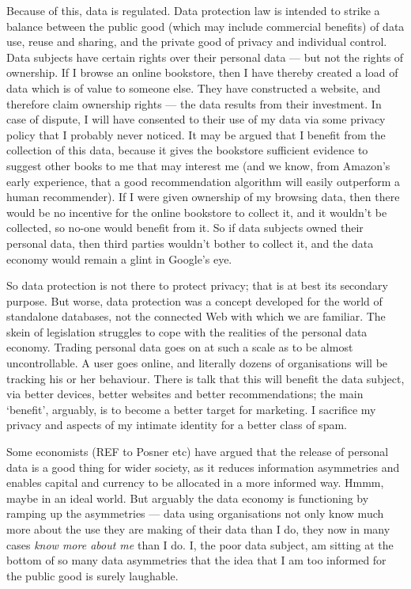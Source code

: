 \documentclass[runningheads,a4paper]{llncs}
\begin{document}
Because of this, data is regulated. Data protection law is intended to strike a balance between the public good (which may include commercial benefits) of data use, reuse and sharing, and the private good of privacy and individual control. Data subjects have certain rights over their personal data --- but not the rights of ownership. If I browse an online bookstore, then I have thereby created a load of data which is of value to someone else. They have constructed a website, and therefore claim ownership rights --- the data results from their investment. In case of dispute, I will have consented to their use of my data via some privacy policy that I probably never noticed. It may be argued that I benefit from the collection of this data, because it gives the bookstore sufficient evidence to suggest other books to me that may interest me (and we know, from Amazon's early experience, that a good recommendation algorithm will easily outperform a human recommender). If I were given ownership of my browsing data, then there would be no incentive for the online bookstore to collect it, and it wouldn't be collected, so no-one would benefit from it. So if data subjects owned their personal data, then third parties wouldn't bother to collect it, and the data economy would remain a glint in Google's eye.

So data protection is not there to protect privacy; that is at best its secondary purpose. But worse, data protection was a concept developed for the world of standalone databases, not the connected Web with which we are familiar. The skein of legislation struggles to cope with the realities of the personal data economy. Trading personal data goes on at such a scale as to be almost uncontrollable. A user goes online, and literally dozens of organisations will be tracking his or her behaviour. There is talk that this will benefit the data subject, via better devices, better websites and better recommendations; the main `benefit', arguably, is to become a better target for marketing. I sacrifice my privacy and aspects of my intimate identity for a better class of spam.

Some economists (REF to Posner etc) have argued that the release of personal data is a good thing for wider society, as it reduces information asymmetries and enables capital and currency to be allocated in a more informed way. Hmmm, maybe in an ideal world. But arguably the data economy is functioning by ramping up the asymmetries --- data using organisations not only know much more about the use they are making of their data than I do, they now in many cases {\em know more about me} than I do. I, the poor data subject, am sitting at the bottom of so many data asymmetries that the idea that I am too informed for the public good is surely laughable.
\end{document}
